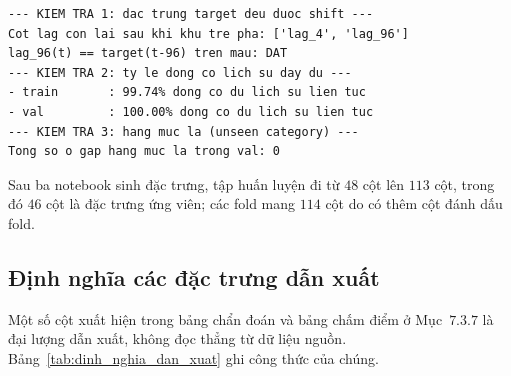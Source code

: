 \begingroup
\par{}\vspace{8pt}
\small\renewcommand{\baselinestretch}{1.0}\selectfont
\begin{verbatim}
--- KIEM TRA 1: dac trung target deu duoc shift ---
Cot lag con lai sau khi khu tre pha: ['lag_4', 'lag_96']
lag_96(t) == target(t-96) tren mau: DAT
--- KIEM TRA 2: ty le dong co lich su day du ---
- train       : 99.74% dong co du lich su lien tuc
- val         : 100.00% dong co du lich su lien tuc
--- KIEM TRA 3: hang muc la (unseen category) ---
Tong so o gap hang muc la trong val: 0
\end{verbatim}
\par\vspace{8pt}
\endgroup
Sau ba notebook sinh đặc trưng, tập huấn luyện đi từ $48$ cột lên $113$ cột, trong đó $46$
cột là đặc trưng ứng viên; các fold mang $114$ cột do có thêm cột đánh dấu fold.

\FloatBarrier
\subsection{Định nghĩa các đặc trưng dẫn xuất}

Một số cột xuất hiện trong bảng chẩn đoán và bảng chấm điểm ở Mục~$7.3.7$ là đại lượng dẫn xuất,
không đọc thẳng từ dữ liệu nguồn. Bảng~\ref{tab:dinh_nghia_dan_xuat} ghi công thức của chúng.

